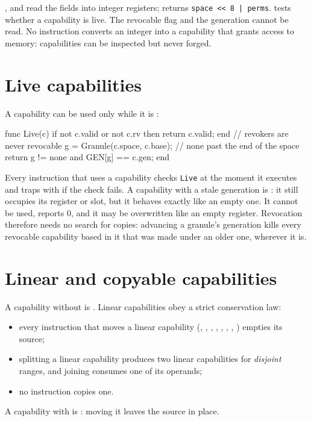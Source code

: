 ,  and  read the fields into integer registers; 
returns \texttt{space << 8 | perms}.  tests whether a capability is live. The revocable
flag and the generation cannot be read. No instruction converts an integer into a capability that grants access to
memory: capabilities can be inspected but never forged.

\section{Live capabilities}\label{sec:live}

A capability can be used only while it is :

\begin{pseudo}
func Live(c)
    if not c.valid or not c.rv then return c.valid; end   // revokers are never revocable
    g = Granule(c.space, c.base);                         // none past the end of the space
    return g != none and GEN[g] == c.gen;
end
\end{pseudo}

Every instruction that uses a capability checks \texttt{Live} at the moment it executes and traps with
 if the check fails. A capability with a stale generation is : it still
occupies its register or slot, but it behaves exactly like an empty one. It cannot be used,
 reports 0, and it may be overwritten like an empty register. Revocation therefore
needs no search for copies: advancing a granule's generation kills every revocable capability based
in it that was made under an older one, wherever it is.

\section{Linear and copyable capabilities}\label{sec:linear}

A capability without  is . Linear capabilities obey a strict conservation law:
\begin{itemize}
\item every instruction that moves a linear capability (, , ,
  , , , , ) empties its source;
\item splitting a linear capability produces two linear capabilities for \emph{disjoint} ranges, and
  joining consumes one of its operands;
\item no instruction copies one.
\end{itemize}
A capability with  is : moving it leaves the source in place.

